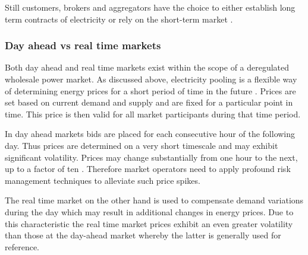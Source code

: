 Still customers, brokers and aggregators have the choice to either establish long term contracts of electricity or rely on the short-term market \cite{hogan1997reshaping}.







\subsubsection{Day ahead vs real time markets}

Both day ahead and real time markets exist within the scope of a deregulated wholesale power market. As discussed above, electricity pooling is a flexible way of determining energy prices for a short period of time in the future \cite{hogan1997reshaping}. Prices are set based on current demand and supply and are fixed for a particular point in time. This price is then valid for all market participants during that time period. 

In day ahead markets bids are placed for each consecutive hour of the following day. Thus prices are determined on a very short timescale and may exhibit significant volatility. Prices may change substantially from one hour to the next, up to a factor of ten \cite{huisman2007hourly}. Therefore market operators need to apply profound risk management techniques to alleviate such price spikes. 

The real time market on the other hand is used to compensate demand variations during the day which may result in additional changes in energy prices. 
Due to this characteristic the real time market prices exhibit an even greater volatility than those at the day-ahead market whereby the latter is generally used for reference. 




